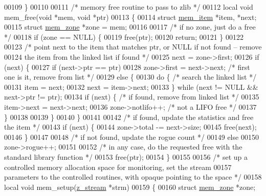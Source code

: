 \begin{DoxyCode}
00109 \}
00110 
00111 \textcolor{comment}{/* memory free routine to pass to zlib */}
00112 local \textcolor{keywordtype}{void} mem\_free(\textcolor{keywordtype}{void} *mem, \textcolor{keywordtype}{void} *ptr)
00113 \{
00114     \textcolor{keyword}{struct }\hyperlink{structmem__item}{mem\_item} *item, *next;
00115     \textcolor{keyword}{struct }\hyperlink{structmem__zone}{mem\_zone} *zone = mem;
00116 
00117     \textcolor{comment}{/* if no zone, just do a free */}
00118     \textcolor{keywordflow}{if} (zone == NULL) \{
00119         free(ptr);
00120         \textcolor{keywordflow}{return};
00121     \}
00122 
00123     \textcolor{comment}{/* point next to the item that matches ptr, or NULL if not found -- remove}
00124 \textcolor{comment}{       the item from the linked list if found */}
00125     next = zone->first;
00126     \textcolor{keywordflow}{if} (next) \{
00127         \textcolor{keywordflow}{if} (next->ptr == ptr)
00128             zone->first = next->next;   \textcolor{comment}{/* first one is it, remove from list */}
00129         \textcolor{keywordflow}{else} \{
00130             \textcolor{keywordflow}{do} \{                        \textcolor{comment}{/* search the linked list */}
00131                 item = next;
00132                 next = item->next;
00133             \} \textcolor{keywordflow}{while} (next != NULL && next->ptr != ptr);
00134             \textcolor{keywordflow}{if} (next) \{                 \textcolor{comment}{/* if found, remove from linked list */}
00135                 item->next = next->next;
00136                 zone->notlifo++;        \textcolor{comment}{/* not a LIFO free */}
00137             \}
00138 
00139         \}
00140     \}
00141 
00142     \textcolor{comment}{/* if found, update the statistics and free the item */}
00143     \textcolor{keywordflow}{if} (next) \{
00144         zone->total -= next->size;
00145         free(next);
00146     \}
00147 
00148     \textcolor{comment}{/* if not found, update the rogue count */}
00149     \textcolor{keywordflow}{else}
00150         zone->rogue++;
00151 
00152     \textcolor{comment}{/* in any case, do the requested free with the standard library function */}
00153     free(ptr);
00154 \}
00155 
00156 \textcolor{comment}{/* set up a controlled memory allocation space for monitoring, set the stream}
00157 \textcolor{comment}{   parameters to the controlled routines, with opaque pointing to the space */}
00158 local \textcolor{keywordtype}{void} mem\_setup(\hyperlink{structz__stream__s}{z\_stream} *strm)
00159 \{
00160     \textcolor{keyword}{struct }\hyperlink{structmem__zone}{mem\_zone} *zone;

\end{DoxyCode}
